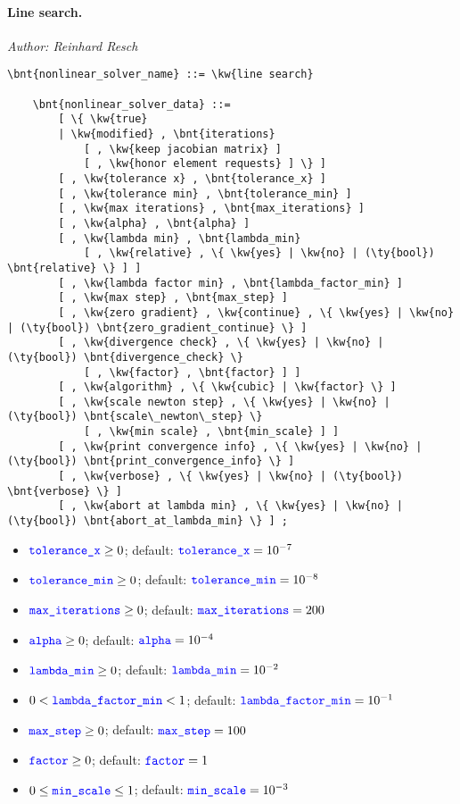 \paragraph{Line search.}
\emph{Author: Reinhard Resch}
\begin{Verbatim}[commandchars=\\\{\}]
    \bnt{nonlinear_solver_name} ::= \kw{line search}

    \bnt{nonlinear_solver_data} ::= 
        [ \{ \kw{true}
        | \kw{modified} , \bnt{iterations}
            [ , \kw{keep jacobian matrix} ]
            [ , \kw{honor element requests} ] \} ]
        [ , \kw{tolerance x} , \bnt{tolerance_x} ]
        [ , \kw{tolerance min} , \bnt{tolerance_min} ]
        [ , \kw{max iterations} , \bnt{max_iterations} ]
        [ , \kw{alpha} , \bnt{alpha} ]
        [ , \kw{lambda min} , \bnt{lambda_min}
            [ , \kw{relative} , \{ \kw{yes} | \kw{no} | (\ty{bool}) \bnt{relative} \} ] ]
        [ , \kw{lambda factor min} , \bnt{lambda_factor_min} ]
        [ , \kw{max step} , \bnt{max_step} ]
        [ , \kw{zero gradient} , \kw{continue} , \{ \kw{yes} | \kw{no} | (\ty{bool}) \bnt{zero_gradient_continue} \} ]
        [ , \kw{divergence check} , \{ \kw{yes} | \kw{no} | (\ty{bool}) \bnt{divergence_check} \}
            [ , \kw{factor} , \bnt{factor} ] ]
        [ , \kw{algorithm} , \{ \kw{cubic} | \kw{factor} \} ]
        [ , \kw{scale newton step} , \{ \kw{yes} | \kw{no} | (\ty{bool}) \bnt{scale\_newton\_step} \}
            [ , \kw{min scale} , \bnt{min_scale} ] ]
        [ , \kw{print convergence info} , \{ \kw{yes} | \kw{no} | (\ty{bool}) \bnt{print_convergence_info} \} ]
        [ , \kw{verbose} , \{ \kw{yes} | \kw{no} | (\ty{bool}) \bnt{verbose} \} ]
        [ , \kw{abort at lambda min} , \{ \kw{yes} | \kw{no} | (\ty{bool}) \bnt{abort_at_lambda_min} \} ] ;
\end{Verbatim}
\begin{itemize}
\item $\textcolor{blue}{\texttt{tolerance\_x}} \ge 0$; default: $\textcolor{blue}{\texttt{tolerance\_x}}=10^{-7}$
\item $\textcolor{blue}{\texttt{tolerance\_min}} \ge 0$; default: $\textcolor{blue}{\texttt{tolerance\_min}} = 10^{-8}$
\item $\textcolor{blue}{\texttt{max\_iterations}} \ge 0$; default: $\textcolor{blue}{\texttt{max\_iterations}} = 200$
\item $\textcolor{blue}{\texttt{alpha}} \ge 0$; default: $\textcolor{blue}{\texttt{alpha}}=10^{-4}$
\item $\textcolor{blue}{\texttt{lambda\_min}} \ge 0$; default: $\textcolor{blue}{\texttt{lambda\_min}}=10^{-2}$
\item $0 < \textcolor{blue}{\texttt{lambda\_factor\_min}} < 1$; default: $\textcolor{blue}{\texttt{lambda\_factor\_min}}=10^{-1}$
\item $\textcolor{blue}{\texttt{max\_step}} \ge 0$; default: $\textcolor{blue}{\texttt{max\_step}} = 100$
\item $\textcolor{blue}{\texttt{factor}} \ge 0$; default: $\textcolor{blue}{\texttt{factor}} = 1$
\item $0 \le \textcolor{blue}{\texttt{min\_scale}} \le 1$; default: $\textcolor{blue}{\texttt{min\_scale}}=10^{-3}$
\end{itemize}

